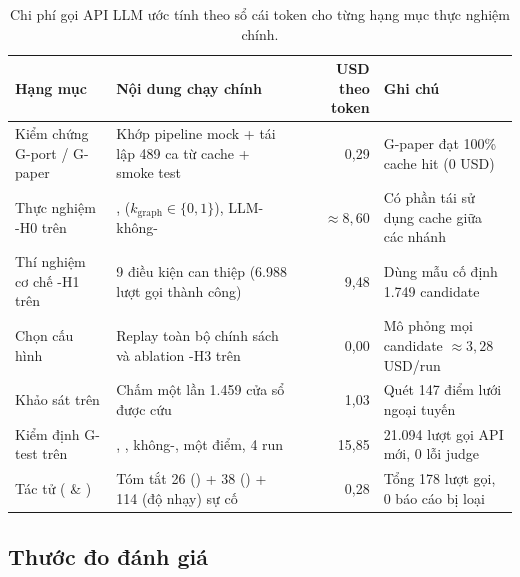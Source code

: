 \begin{table}[H]
  \centering
  \caption[Tổng hợp chi phí gọi API LLM theo các hạng mục thực nghiệm]{Chi phí gọi API LLM ước tính theo sổ cái token cho từng hạng mục thực nghiệm chính.}
  \label{tab:ch5-costs}
  \tblfont
  \tblsetup
  \setlength{\tabcolsep}{4pt}
  \begin{tabularx}{\linewidth}{|>{\raggedright\arraybackslash}p{3.0cm}|Y|r|Y|}
    \hline
    \textbf{Hạng mục} & \textbf{Nội dung chạy chính} & \textbf{USD theo token} & \textbf{Ghi chú} \\
    \hline
    Kiểm chứng G-port / G-paper & Khớp pipeline mock + tái lập 489 ca từ cache + smoke test & 0,29 & G-paper đạt 100\% cache hit (0 USD) \\
    \hline
    Thực nghiệm \hyp{H0} trên  & ,  ($k_{\text{graph}} \in \{0, 1\}$), LLM-không- & $\approx 8{,}60$ & Có phần tái sử dụng cache giữa các nhánh \\
    \hline
    Thí nghiệm cơ chế \hyp{H1} trên  & 9 điều kiện can thiệp (6.988 lượt gọi thành công) & 9,48 & Dùng mẫu cố định 1.749 candidate \\
    \hline
    Chọn cấu hình \CTAV{} & Replay toàn bộ chính sách và ablation \hyp{H3} trên  & 0,00 & Mô phỏng  mọi candidate $\approx 3{,}28$ USD/run \\
    \hline
    Khảo sát  trên  & Chấm một lần 1.459 cửa sổ được cứu & 1,03 & Quét 147 điểm lưới ngoại tuyến \\
    \hline
    Kiểm định G-test trên  & , , không-,  một điểm, 4 run  & 15,85 & 21.094 lượt gọi API mới, 0 lỗi judge \\
    \hline
    Tác tử  ( \& ) & Tóm tắt 26 () + 38 () + 114 (độ nhạy) sự cố & 0,28 & Tổng 178 lượt gọi, 0 báo cáo bị loại \\
    \hline
  \end{tabularx}
\end{table}

\subsection{Thước đo đánh giá}
\label{sec:ch5-metrics}

